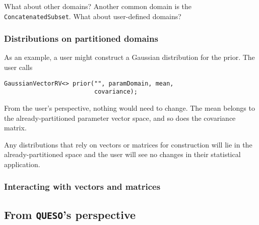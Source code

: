 \documentclass{article}
\newcommand{\Queso}{\texttt{QUESO}}
\begin{document}
What about other domains?  Another common domain is the
\lstinline|ConcatenatedSubset|.  What about user-defined domains?

\subsubsection{Distributions on partitioned domains}

As an example, a user might construct a Gaussian distribution for the prior.
The user calls
\begin{lstlisting}
GaussianVectorRV<> prior("", paramDomain, mean,
                         covariance);
\end{lstlisting}
From the user's perspective, nothing would need to change.  The mean belongs
to the already-partitioned parameter vector space, and so does the covariance
matrix.

Any distributions that rely on vectors or matrices for construction will lie
in the already-partitioned space and the user will see no changes in their
statistical application.

\subsubsection{Interacting with vectors and matrices}



\subsection{From \Queso's perspective}
\end{document}
